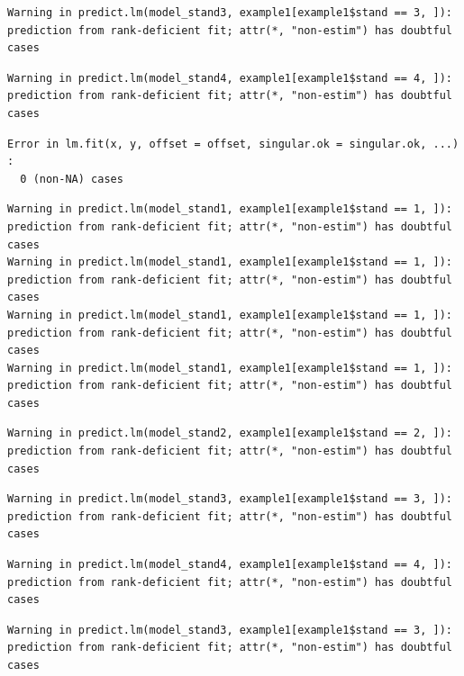 \documentclass[
  letterpaper,
  DIV=11,
  numbers=noendperiod]{scrartcl}
\begin{document}
\begin{verbatim}
Warning in predict.lm(model_stand3, example1[example1$stand == 3, ]):
prediction from rank-deficient fit; attr(*, "non-estim") has doubtful cases
\end{verbatim}

\begin{verbatim}
Warning in predict.lm(model_stand4, example1[example1$stand == 4, ]):
prediction from rank-deficient fit; attr(*, "non-estim") has doubtful cases
\end{verbatim}

\begin{verbatim}
Error in lm.fit(x, y, offset = offset, singular.ok = singular.ok, ...) : 
  0 (non-NA) cases
\end{verbatim}

\begin{verbatim}
Warning in predict.lm(model_stand1, example1[example1$stand == 1, ]):
prediction from rank-deficient fit; attr(*, "non-estim") has doubtful cases
Warning in predict.lm(model_stand1, example1[example1$stand == 1, ]):
prediction from rank-deficient fit; attr(*, "non-estim") has doubtful cases
Warning in predict.lm(model_stand1, example1[example1$stand == 1, ]):
prediction from rank-deficient fit; attr(*, "non-estim") has doubtful cases
Warning in predict.lm(model_stand1, example1[example1$stand == 1, ]):
prediction from rank-deficient fit; attr(*, "non-estim") has doubtful cases
\end{verbatim}

\begin{verbatim}
Warning in predict.lm(model_stand2, example1[example1$stand == 2, ]):
prediction from rank-deficient fit; attr(*, "non-estim") has doubtful cases
\end{verbatim}

\begin{verbatim}
Warning in predict.lm(model_stand3, example1[example1$stand == 3, ]):
prediction from rank-deficient fit; attr(*, "non-estim") has doubtful cases
\end{verbatim}

\begin{verbatim}
Warning in predict.lm(model_stand4, example1[example1$stand == 4, ]):
prediction from rank-deficient fit; attr(*, "non-estim") has doubtful cases
\end{verbatim}

\begin{verbatim}
Warning in predict.lm(model_stand3, example1[example1$stand == 3, ]):
prediction from rank-deficient fit; attr(*, "non-estim") has doubtful cases
\end{verbatim}
\end{document}
